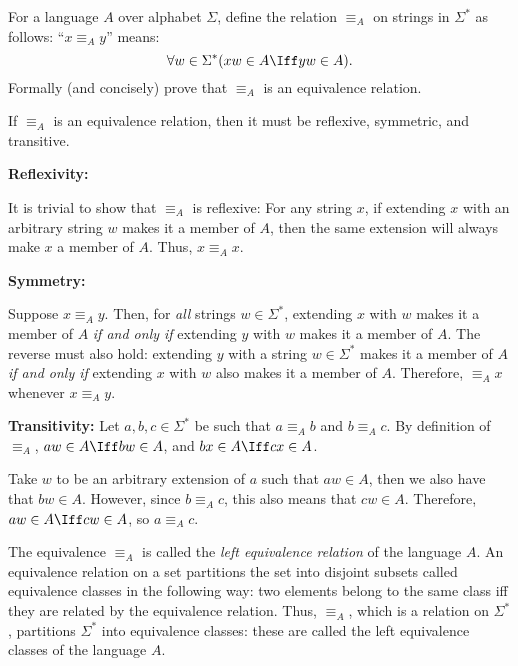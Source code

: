 \begin{problem}
  \begin{enumalph}
    \item
    For a language $A$ over alphabet $\Sigma$, define
    the relation $\equiv_A$ on strings in $\Sigma^*$ as follows:
    ``$x \equiv_A y$'' means:
    \[ \forall w \in \Sigma^* (xw \in A \Iff yw \in A). \]
    \step
    Formally (and concisely) prove that $\equiv_A$ is an equivalence relation.
    \begin{Answer}
      If $\equiv_A$ is an equivalence relation,
      then it must be reflexive, symmetric, and transitive.
      \begin{enumroman}
        \item \textbf{Reflexivity:}

        \step
          It is trivial to show that $\equiv_A$ is reflexive:
          For any string $x$, if extending $x$ with an arbitrary string $w$ makes
          it a member of $A$, then the same extension will always make $x$ a member
          of $A$.  Thus, $x \equiv_A x$.
        \item \textbf{Symmetry:}
        
        \step
          Suppose $x \equiv_A y$.
          Then, for \emph{all} strings $w \in \Sigma^*$, extending $x$ with $w$ makes it a member of $A$
          \emph{if and only if} extending $y$ with $w$ makes it a member of $A$.
          The reverse must also hold: extending $y$ with a string $w \in \Sigma^*$
          makes it a member of $A$ \emph{if and only if} extending $x$ with $w$ also makes it a member of $A$.
          Therefore, $\equiv_A x$ whenever $x \equiv_A y$.
        \item \textbf{Transitivity:}
          Let $a, b, c \in \Sigma^*$ be such that $a \equiv_A b$ and $b \equiv_A c$.
          By definition of $\equiv_A$, $aw \in A \Iff bw \in A$, and $bx \in A \Iff cx \in A$.

          \step
          Take $w$ to be an arbitrary extension of $a$ such that $aw \in A$,
          then we also have that $bw \in A$. However, since $b \equiv_A c$,
          this also means that $cw \in A$.
          Therefore, $aw \in A \Iff cw \in A$, so $a \equiv_A c$.
      \end{enumroman}
    \end{Answer}
    
    \newpage
    \item The equivalence $\equiv_A$ is called the
      \emph{left equivalence relation} of the language $A$.
      An equivalence relation on a set partitions the set into
      disjoint subsets called equivalence classes
      in the following way: two elements belong to the same
      class iff they are related by the equivalence relation.
      Thus, $\equiv_A$, which is a relation on $\Sigma^*$,
      partitions $\Sigma^*$ into equivalence classes:
      these are called the left equivalence classes of the language $A$.


\end{enumalph}
\end{problem}
